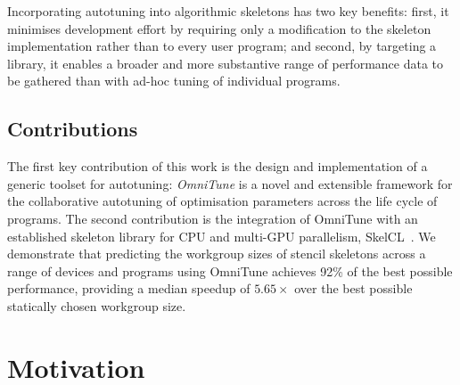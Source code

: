 \documentclass[nonatbib,preprint,9pt]{sigplanconf}
\begin{document}
Incorporating autotuning into algorithmic skeletons has two key
benefits: first, it minimises development effort by requiring only a
modification to the skeleton implementation rather than to every user
program; and second, by targeting a library, it enables a broader and
more substantive range of performance data to be gathered than with
ad-hoc tuning of individual programs.


\subsection{Contributions}

The first key contribution of this work is the design and
implementation of a generic toolset for autotuning: \emph{OmniTune} is
a novel and extensible framework for the collaborative autotuning of
optimisation parameters across the life cycle of programs. The second
contribution is the integration of OmniTune with an established
skeleton library for CPU and multi-GPU parallelism,
SkelCL~\cite{Steuwer2011}. We demonstrate that predicting the
workgroup sizes of stencil skeletons across a range of devices and
programs using OmniTune achieves 92\% of the best possible
performance, providing a median speedup of $5.65\times$ over the best
possible statically chosen workgroup size.


\section{Motivation}
\end{document}
